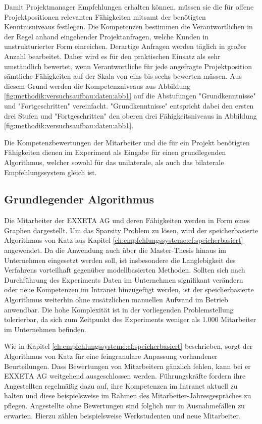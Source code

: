 Damit Projektmanager Empfehlungen erhalten können, müssen sie die für offene Projektpositionen relevanten Fähigkeiten mitsamt der benötigten Kenntnisniveaus festlegen. Die Kompetenzen bestimmen die Verantwortlichen in der Regel anhand eingehender Projektanfragen, welche Kunden in unstrukturierter Form einreichen. Derartige Anfragen werden täglich in großer Anzahl bearbeitet. Daher wird es für den praktischen Einsatz als sehr umständlich bewertet, wenn Verantwortliche für jede angefragte Projektposition sämtliche Fähigkeiten auf der Skala von eins bis sechs bewerten müssen. Aus diesem Grund werden die Kompetenzniveaus aus Abbildung \ref{fig:methodik:versuchsaufbau:daten:abb1} auf die Abstufungen "Grundkenntnisse" und "Fortgeschritten" vereinfacht. "Grundkenntnisse" entspricht dabei den ersten drei Stufen und "Fortgeschritten" den oberen drei Fähigkeitsniveaus in Abbildung \ref{fig:methodik:versuchsaufbau:daten:abb1}.

Die Kompetenzbewertungen der Mitarbeiter und die für ein Projekt benötigten Fähigkeiten dienen im Experiment als Eingabe für einen grundlegenden Algorithmus, welcher sowohl für das unilaterale, als auch das bilaterale Empfehlungssystem gleich ist.

\subsection{Grundlegender Algorithmus}
\label{ch:methodik:versuchsaufbau:grundlegend}
Die Mitarbeiter der EXXETA AG und deren Fähigkeiten werden in Form eines Graphen dargestellt. Um das Sparsity Problem zu lösen, wird der speicherbasierte Algorithmus von Katz aus Kapitel \ref{ch:empfehlungssysteme:cf:speicherbasiert} angewendet. Da die Anwendung auch über die Master-Thesis hinaus im Unternehmen eingesetzt werden soll, ist insbesondere die Langlebigkeit des Verfahrens vorteilhaft gegenüber modellbasierten Methoden. Sollten sich nach Durchführung des Experiments Daten im Unternehmen signifikant verändern oder neue Kompetenzen im Intranet hinzugefügt werden, ist der speicherbasierte Algorithmus weiterhin ohne zusätzlichen manuellen Aufwand im Betrieb anwendbar. Die hohe Komplexität ist in der vorliegenden Problemstellung tolerierbar, da sich zum Zeitpunkt des Experiments weniger als 1.000 Mitarbeiter im Unternehmen befinden.

Wie in Kapitel \ref{ch:empfehlungssysteme:cf:speicherbasiert} beschrieben, sorgt der Algorithmus von Katz für eine feingranulare Anpassung vorhandener Beurteilungen. Dass Bewertungen von Mitarbeitern gänzlich fehlen, kann bei er EXXETA AG weitgehend ausgeschlossen werden. Führungskräfte fordern ihre Angestellten regelmäßig dazu auf, ihre Kompetenzen im Intranet aktuell zu halten und diese beispielsweise im Rahmen des Mitarbeiter-Jahresgespräches zu pflegen. Angestellte ohne Bewertungen sind folglich nur in Ausnahmefällen zu erwarten. Hierzu zählen beispielsweise Werkstudenten und neue Mitarbeiter.

